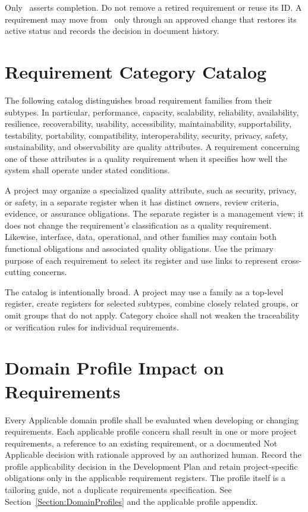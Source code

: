 Only \ReqStatusDone\ asserts completion. Do not remove a retired requirement or
reuse its ID. A requirement may move from \ReqStatusRetired\ only through an
approved change that restores its active status and records the decision in
document history.

\section{Requirement Category Catalog}
The following catalog distinguishes broad requirement families from their
subtypes. In particular, performance, capacity, scalability, reliability,
availability, resilience, recoverability, usability, accessibility,
maintainability, supportability, testability, portability, compatibility,
interoperability, security, privacy, safety, sustainability, and observability
are quality attributes. A requirement concerning one of these attributes is a
quality requirement when it specifies how well the system shall operate under
stated conditions.

A project may organize a specialized quality attribute, such as security,
privacy, or safety, in a separate register when it has distinct owners, review
criteria, evidence, or assurance obligations. The separate register is a
management view; it does not change the requirement's classification as a
quality requirement. Likewise, interface, data, operational, and other families
may contain both functional obligations and associated quality obligations. Use
the primary purpose of each requirement to select its register and use links to
represent cross-cutting concerns.

The catalog is intentionally broad. A project may use a family as a top-level
register, create registers for selected subtypes, combine closely related
groups, or omit groups that do not apply. Category choice shall not weaken the
traceability or verification rules for individual requirements.

\section{Domain Profile Impact on Requirements}
\label{Section:DomainProfileRequirements}
Every Applicable domain profile shall be evaluated when developing or changing
requirements. Each applicable profile concern shall result in one or more
project requirements, a reference to an existing requirement, or a documented
Not Applicable decision with rationale approved by an authorized human. Record
the profile applicability decision in the Development Plan and retain
project-specific obligations only in the applicable requirement registers.
The profile itself is a tailoring guide, not a duplicate requirements
specification. See Section~\ref{Section:DomainProfiles} and the applicable
profile appendix.

